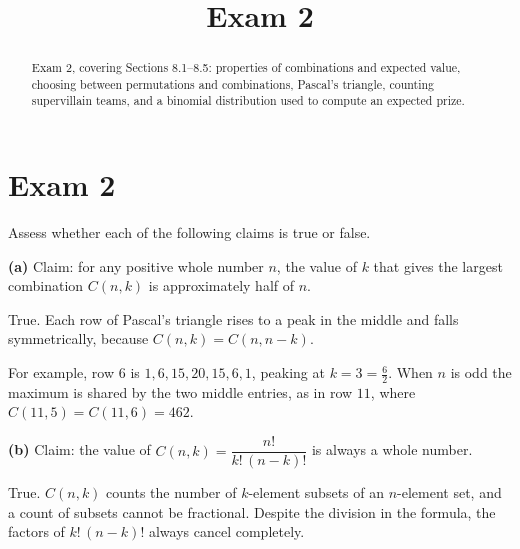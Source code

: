 \documentclass[12pt]{ximera}
\title{Exam 2}
\begin{document}
\begin{abstract}
Exam 2, covering Sections 8.1--8.5: properties of combinations and expected value,
choosing between permutations and combinations, Pascal's triangle, counting
supervillain teams, and a binomial distribution used to compute an expected prize.
\end{abstract}
\maketitle

\section*{Exam 2}

\begin{problem}
Assess whether each of the following claims is true or false.

\begin{prompt}
\textbf{(a)} Claim: for any positive whole number $n$, the value of $k$ that gives
the largest combination $C(n,k)$ is approximately half of $n$.

\begin{multipleChoice}
\end{multipleChoice}

\begin{feedback}
True. Each row of Pascal's triangle rises to a peak in the middle and falls
symmetrically, because $C(n,k)=C(n,n-k)$.

For example, row $6$ is $1, 6, 15, 20, 15, 6, 1$, peaking at $k=3=\frac62$. When $n$
is odd the maximum is shared by the two middle entries, as in row $11$, where
$C(11,5)=C(11,6)=462$.
\end{feedback}
\end{prompt}

\begin{prompt}
\textbf{(b)} Claim: the value of $C(n,k)=\dfrac{n!}{k!\,(n-k)!}$ is always a whole
number.

\begin{multipleChoice}
\end{multipleChoice}

\begin{feedback}
True. $C(n,k)$ counts the number of $k$-element subsets of an $n$-element set, and a
count of subsets cannot be fractional. Despite the division in the formula, the
factors of $k!\,(n-k)!$ always cancel completely.
\end{feedback}
\end{prompt}


\end{problem}
\end{document}
